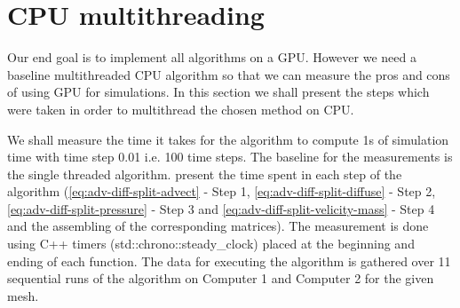 \section{CPU multithreading}
Our end goal is to implement all algorithms on a GPU. However we need a baseline multithreaded CPU algorithm so that we can measure the pros and cons of using GPU for simulations. In this section we shall present the steps which were taken in order to multithread the chosen method on CPU.

We shall measure the time it takes for the algorithm to compute 1s of simulation time with time step 0.01 i.e. 100 time steps. The baseline for the measurements is the single threaded algorithm.  present the time spent in each step of the algorithm (\cref{eq:adv-diff-split-advect} - Step 1, \cref{eq:adv-diff-split-diffuse} - Step 2, \cref{eq:adv-diff-split-pressure} - Step 3 and \cref{eq:adv-diff-split-velicity-mass} - Step 4 and the assembling of the corresponding matrices). The measurement is done using C++ timers (std::chrono::steady\_clock) placed at the beginning and ending of each function. The data for executing the algorithm is gathered over 11 sequential runs of the algorithm on Computer 1 and Computer 2 for the given mesh.
